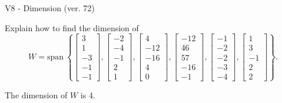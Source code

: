 \begin{exercise}
  \begin{exerciseTitle}V8 - Dimension (ver. 72)\end{exerciseTitle}
  \begin{exerciseStatement}
    Explain how to find the dimension of 
\[W=\mathrm{span}\ \left\{\left[\begin{array}{r}
3 \\
1 \\
-3 \\
-1 \\
-1
\end{array}\right] , \left[\begin{array}{r}
-2 \\
-4 \\
-1 \\
2 \\
1
\end{array}\right] , \left[\begin{array}{r}
4 \\
-12 \\
-16 \\
4 \\
0
\end{array}\right] , \left[\begin{array}{r}
-12 \\
46 \\
57 \\
-16 \\
-1
\end{array}\right] , \left[\begin{array}{r}
-1 \\
-2 \\
-2 \\
-3 \\
-4
\end{array}\right] , \left[\begin{array}{r}
1 \\
3 \\
-1 \\
2 \\
2
\end{array}\right]\right\}.\]



  \end{exerciseStatement}
  \begin{exerciseAnswer}
   The dimension of \(W\) is  \(4\).
  


  \end{exerciseAnswer}
\end{exercise}